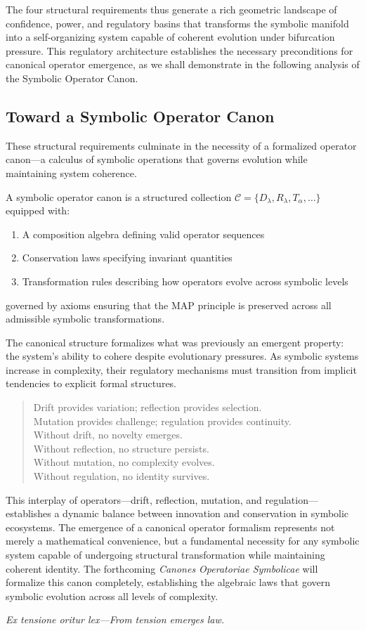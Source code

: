 The four structural requirements thus generate a rich geometric landscape of confidence, power, and regulatory basins that transforms the symbolic manifold into a self-organizing system capable of coherent evolution under bifurcation pressure. This regulatory architecture establishes the necessary preconditions for canonical operator emergence, as we shall demonstrate in the following analysis of the Symbolic Operator Canon.
\subsection{Toward a Symbolic Operator Canon}
\label{subsection:bk6_toward_a_symbolic_operator_canon}
These structural requirements culminate in the necessity of a formalized operator canon—a calculus of symbolic operations that governs evolution while maintaining system coherence.
\begin{definition}
\label{definition:bk6_symbolic_operator_canon}
A symbolic operator canon is a structured collection $\mathcal{C} = \{D_{\lambda}, R_{\lambda}, T_{\alpha}, \ldots\}$ equipped with:
\begin{enumerate}
\item A composition algebra defining valid operator sequences
\item Conservation laws specifying invariant quantities
\item Transformation rules describing how operators evolve across symbolic levels
\end{enumerate}
governed by axioms ensuring that the MAP principle is preserved across all admissible symbolic transformations.
\end{definition}
The canonical structure formalizes what was previously an emergent property: the system's ability to cohere despite evolutionary pressures. As symbolic systems increase in complexity, their regulatory mechanisms must transition from implicit tendencies to explicit formal structures.
\begin{quote}
Drift provides variation; reflection provides selection.\\
Mutation provides challenge; regulation provides continuity.\\
Without drift, no novelty emerges.\\
Without reflection, no structure persists.\\
Without mutation, no complexity evolves.\\
Without regulation, no identity survives.
\end{quote}
This interplay of operators—drift, reflection, mutation, and regulation—establishes a dynamic balance between innovation and conservation in symbolic ecosystems. The emergence of a canonical operator formalism represents not merely a mathematical convenience, but a fundamental necessity for any symbolic system capable of undergoing structural transformation while maintaining coherent identity.
The forthcoming \emph{Canones Operatoriae Symbolicae} will formalize this canon completely, establishing the algebraic laws that govern symbolic evolution across all levels of complexity.
\begin{flushright}
\textit{Ex tensione oritur lex—From tension emerges law.}
\end{flushright}
